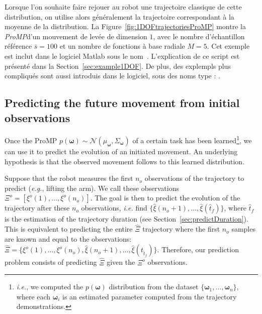 \documentclass[utf8]{frontiersSCNS} %
\newcommand{\todo}[1]{\textcolor{red}{\textbf{/*#1*/}}}
\begin{document}
Lorsque l'on souhaite faire rejouer au robot une trajectoire classique de cette distribution, on utilise alors généralement la trajectoire correspondant à la moyenne de la distribution. La Figure~\ref{fig:1DOFtrajectoriesProMP} montre la \textit{ProMP}d'un mouvement de levée de dimension $1$, avec le nombre d'échantillon référence $\bar{s}=100$ et un nombre de fonctions à base radiale $M=5$. %
Cet exemple est inclut dans le logiciel Matlab sous le nom~. L'explication de ce script est présenté dans la Section~\ref{sec:example1DOF}. De plus, des explempls plus compliqués sont aussi introduis dans le logiciel, sous des noms type : .




\subsection{Predicting the future movement from initial observations} \label{sec:predict}

Once the ProMP  $p(\boldsymbol{\omega}) \sim \mathcal{N}(\mu_{\boldsymbol{\omega}}, \Sigma_{\boldsymbol{\omega}})$ of a certain task has been learned\footnote{\textit{i.e.}, we computed the $p(\boldsymbol{\omega})$ distribution from the dataset $\{\boldsymbol{\omega}_1, \ldots, \boldsymbol{\omega}_n\}$, where each $\boldsymbol{\omega}_i$ is an estimated parameter computed from the trajectory demonstrations.}, we can use it to predict the evolution of an initiated movement. An underlying hypothesis is that the observed movement follows to this learned distribution.

Suppose that the robot measures the first $n_o$ observations of the trajectory to predict (\textit{e.g.}, lifting the arm). We call these observations $\Xi^o=[\xi^o(1),\ldots, \xi^o({n_o})].$
The goal is then to predict the evolution of the trajectory after these ${n_o}$ observations, \textit{i.e.} find $\{\hat{\xi}({n_o+1}),\ldots,\hat{\xi}(\hat{t}_f)\}$, where $\hat{t}_f$ is the estimation of the trajectory duration (see Section~\ref{sec:predictDuration}). 
This is equivalent to predicting the entire $\hat{\Xi}$ trajectory where the first $n_o$ samples are known and equal to the observations: $\hat{\Xi} = \{\xi^o({1}), \ldots, \xi^o({n_o}), \hat{\xi}({n_o+1}), \ldots, \hat{\xi}(t_{\hat{t}_f})\}$.
Therefore, our prediction problem consists of predicting $\hat{\Xi}$ given the $\Xi^o$ observations. 
\end{document}
